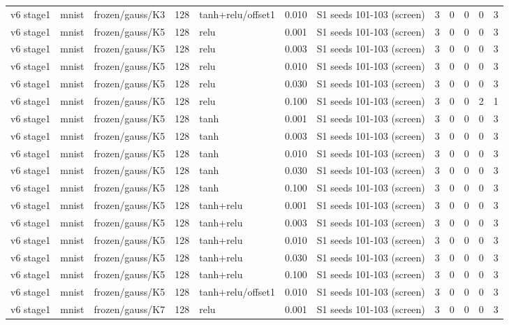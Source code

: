 \begin{table}[htbp]
{\begin{tabular}{@{}lllrlrlrrrrr@{}}
v6 stage1 & mnist & frozen/gauss/K3 & 128 & tanh+relu/offset1 & 0.010 & S1 seeds 101-103 (screen) & 3 & 0 & 0 & 0 & 3 \\
v6 stage1 & mnist & frozen/gauss/K5 & 128 & relu & 0.001 & S1 seeds 101-103 (screen) & 3 & 0 & 0 & 0 & 3 \\
v6 stage1 & mnist & frozen/gauss/K5 & 128 & relu & 0.003 & S1 seeds 101-103 (screen) & 3 & 0 & 0 & 0 & 3 \\
v6 stage1 & mnist & frozen/gauss/K5 & 128 & relu & 0.010 & S1 seeds 101-103 (screen) & 3 & 0 & 0 & 0 & 3 \\
v6 stage1 & mnist & frozen/gauss/K5 & 128 & relu & 0.030 & S1 seeds 101-103 (screen) & 3 & 0 & 0 & 0 & 3 \\
v6 stage1 & mnist & frozen/gauss/K5 & 128 & relu & 0.100 & S1 seeds 101-103 (screen) & 3 & 0 & 0 & 2 & 1 \\
v6 stage1 & mnist & frozen/gauss/K5 & 128 & tanh & 0.001 & S1 seeds 101-103 (screen) & 3 & 0 & 0 & 0 & 3 \\
v6 stage1 & mnist & frozen/gauss/K5 & 128 & tanh & 0.003 & S1 seeds 101-103 (screen) & 3 & 0 & 0 & 0 & 3 \\
v6 stage1 & mnist & frozen/gauss/K5 & 128 & tanh & 0.010 & S1 seeds 101-103 (screen) & 3 & 0 & 0 & 0 & 3 \\
v6 stage1 & mnist & frozen/gauss/K5 & 128 & tanh & 0.030 & S1 seeds 101-103 (screen) & 3 & 0 & 0 & 0 & 3 \\
v6 stage1 & mnist & frozen/gauss/K5 & 128 & tanh & 0.100 & S1 seeds 101-103 (screen) & 3 & 0 & 0 & 0 & 3 \\
v6 stage1 & mnist & frozen/gauss/K5 & 128 & tanh+relu & 0.001 & S1 seeds 101-103 (screen) & 3 & 0 & 0 & 0 & 3 \\
v6 stage1 & mnist & frozen/gauss/K5 & 128 & tanh+relu & 0.003 & S1 seeds 101-103 (screen) & 3 & 0 & 0 & 0 & 3 \\
v6 stage1 & mnist & frozen/gauss/K5 & 128 & tanh+relu & 0.010 & S1 seeds 101-103 (screen) & 3 & 0 & 0 & 0 & 3 \\
v6 stage1 & mnist & frozen/gauss/K5 & 128 & tanh+relu & 0.030 & S1 seeds 101-103 (screen) & 3 & 0 & 0 & 0 & 3 \\
v6 stage1 & mnist & frozen/gauss/K5 & 128 & tanh+relu & 0.100 & S1 seeds 101-103 (screen) & 3 & 0 & 0 & 0 & 3 \\
v6 stage1 & mnist & frozen/gauss/K5 & 128 & tanh+relu/offset1 & 0.010 & S1 seeds 101-103 (screen) & 3 & 0 & 0 & 0 & 3 \\
v6 stage1 & mnist & frozen/gauss/K7 & 128 & relu & 0.001 & S1 seeds 101-103 (screen) & 3 & 0 & 0 & 0 & 3 \\

\end{tabular}}
\end{table}
